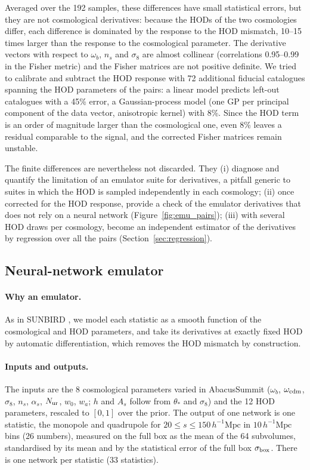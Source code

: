 \documentclass[11pt,twocolumn]{article}
\newcommand{\Mpch}{\,h^{-1}\mathrm{Mpc}}
\begin{document}
Averaged over the 192 samples, these differences have small statistical errors, but they are not cosmological derivatives: because the HODs of the two cosmologies differ, each difference is dominated by the response to the HOD mismatch, 10--15 times larger than the response to the cosmological parameter. The derivative vectors with respect to $\omega_b$, $n_s$ and $\sigma_8$ are almost collinear (correlations 0.95--0.99 in the Fisher metric) and the Fisher matrices are not positive definite. We tried to calibrate and subtract the HOD response with 72 additional fiducial catalogues spanning the HOD parameters of the pairs: a linear model predicts left-out catalogues with a 45\% error, a Gaussian-process model (one GP per principal component of the data vector, anisotropic kernel) with 8\%. Since the HOD term is an order of magnitude larger than the cosmological one, even 8\% leaves a residual comparable to the signal, and the corrected Fisher matrices remain unstable.

The finite differences are nevertheless not discarded. They (i) diagnose and quantify the limitation of an emulator suite for derivatives, a pitfall generic to suites in which the HOD is sampled independently in each cosmology; (ii) once corrected for the HOD response, provide a check of the emulator derivatives that does not rely on a neural network (Figure~\ref{fig:emu_pairs}); (iii) with several HOD draws per cosmology, become an independent estimator of the derivatives by regression over all the pairs (Section~\ref{sec:regression}).

\subsection{Neural-network emulator}
\label{sec:emulator}

\paragraph{Why an emulator.} As in SUNBIRD \cite{CuestaLazaro2024}, we model each statistic as a smooth function of the cosmological and HOD parameters, and take its derivatives at exactly fixed HOD by automatic differentiation, which removes the HOD mismatch by construction.

\paragraph{Inputs and outputs.} The inputs are the 8 cosmological parameters varied in AbacusSummit ($\omega_b$, $\omega_{\rm cdm}$, $\sigma_8$, $n_s$, $\alpha_s$, $N_{\rm ur}$, $w_0$, $w_a$; $h$ and $A_s$ follow from $\theta_*$ and $\sigma_8$) and the 12 HOD parameters, rescaled to $[0,1]$ over the prior. The output of one network is one statistic, the monopole and quadrupole for $20\le s\le150\Mpch$ in $10\Mpch$ bins (26 numbers), measured on the full box as the mean of the 64 subvolumes, standardised by its mean and by the statistical error of the full box $\sigma_{\rm box}$. There is one network per statistic (33 statistics).
\end{document}
